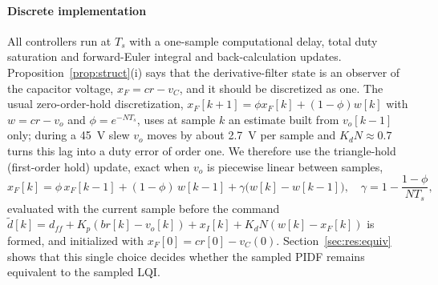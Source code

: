 \paragraph{Discrete implementation}
All controllers run at $T_s$ with a one-sample computational delay, total duty
saturation and forward-Euler integral and back-calculation updates.
Proposition~\ref{prop:struct}(i) says that the derivative-filter state is an
observer of the capacitor voltage, $x_F=cr-v_C$, and it should be discretized as
one. The usual zero-order-hold discretization,
$x_F[k{+}1]=\phi x_F[k]+(1-\phi)w[k]$ with $w=cr-v_o$ and $\phi=e^{-NT_s}$, uses at
sample $k$ an estimate built from $v_o[k{-}1]$ only; during a \SI{45}{V} slew
$v_o$ moves by about \SI{2.7}{V} per sample and $K_dN\approx0.7$ turns this lag
into a duty error of order one. We therefore use the triangle-hold (first-order
hold) update, exact when $v_o$ is piecewise linear between samples,
\begin{equation}
x_F[k]=\phi\,x_F[k{-}1]+(1-\phi)\,w[k{-}1]+\gamma\big(w[k]-w[k{-}1]\big),\quad
\gamma=1-\frac{1-\phi}{NT_s},
\label{eq:foh}
\end{equation}
evaluated with the current sample before the command
$\tilde d[k]=d_{ff}+K_p(br[k]-v_o[k])+x_I[k]+K_dN(w[k]-x_F[k])$ is formed, and
initialized with $x_F[0]=cr[0]-v_C(0)$. Section~\ref{sec:res:equiv} shows that
this single choice decides whether the sampled PIDF remains equivalent to the
sampled LQI.

